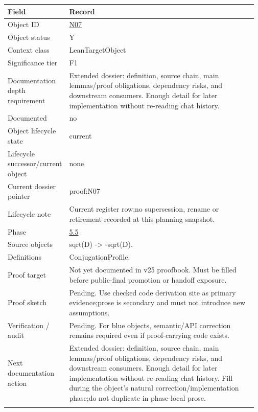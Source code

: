 \begin{longtable}{L{0.16\linewidth} L{0.81\linewidth}}
\hline
\textbf{Field} & \textbf{Record}\\
\hline
Object ID & \hyperlink{object-row-N07}{N07}\\
\hline\addlinespace[0.20em]
Object status & Y\\
\hline\addlinespace[0.20em]
Context class & LeanTargetObject\\
\hline\addlinespace[0.20em]
Significance tier & F1\\
\hline\addlinespace[0.20em]
Documentation depth requirement & Extended dossier: definition, source chain, main lemmas/\allowbreak{}proof obligations, dependency risks, and downstream consumers. Enough detail for later implementation without re-reading chat history.\\
\hline\addlinespace[0.20em]
Documented & no\\
\hline\addlinespace[0.20em]
Object lifecycle state & current\\
\hline\addlinespace[0.20em]
Lifecycle successor/\allowbreak{}current object & none\\
\hline\addlinespace[0.20em]
Current dossier pointer & proof:N07\\
\hline\addlinespace[0.20em]
Lifecycle note & Current register row;\newline no supersession, rename or retirement recorded at this planning snapshot.\\
\hline\addlinespace[0.20em]
Phase & \hyperlink{phase-row-5-5}{5.5}\\
\hline\addlinespace[0.20em]
Source objects & sqrt(D) -> -sqrt(D).\\
\hline\addlinespace[0.20em]
Definitions & ConjugationProfile.\\
\hline\addlinespace[0.20em]
Proof target & Not yet documented in v25 proofbook. Must be filled before public-final promotion or handoff exposure.\\
\hline\addlinespace[0.20em]
Proof sketch & Pending. Use checked code derivation site as primary evidence;\newline prose is secondary and must not introduce new assumptions.\\
\hline\addlinespace[0.20em]
Verification /\allowbreak{} audit & Pending. For blue objects, semantic/\allowbreak{}API correction remains required even if proof-carrying code exists.\\
\hline\addlinespace[0.20em]
Next documentation action & Extended dossier: definition, source chain, main lemmas/\allowbreak{}proof obligations, dependency risks, and downstream consumers. Enough detail for later implementation without re-reading chat history. Fill during the object's natural correction/\allowbreak{}implementation phase;\newline do not duplicate in phase-local prose.\\
\hline\addlinespace[0.20em]
\end{longtable}
